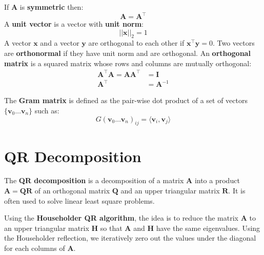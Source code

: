 \documentclass[12pt]{report}
\begin{document}
        If $\boldsymbol{A}$ is \textbf{symmetric} then:
        \begin{equation}
            \boldsymbol{A} = \boldsymbol{A}^\top
        \end{equation}
        A \textbf{unit vector} is a vector with \textbf{unit norm}:
        \begin{equation}
            ||\boldsymbol{x}||_2 = 1
        \end{equation}
        A vector $\boldsymbol{x}$ and a vector $\boldsymbol{y}$ are orthogonal to each other if $\boldsymbol{x}^\top \boldsymbol{y} = 0$.
        Two vectors are \textbf{orthonormal} if they have unit norm and are orthogonal.
        An \textbf{orthogonal matrix} is a squared matrix whose rows and columns are mutually orthogonal:
        \begin{align}
            \boldsymbol{A}^\top \boldsymbol{A} = \boldsymbol{A}\boldsymbol{A}^\top &= \boldsymbol{I} \\
            \boldsymbol{A}^\top &= \boldsymbol{A}^{-1}
        \end{align}
        
        The \textbf{Gram matrix} is defined as the pair-wise dot product of a set of vectors $\{\boldsymbol{v}_0 \dots \boldsymbol{v}_n\}$ such as:
        \begin{equation}
            G(\boldsymbol{v}_0 \dots \boldsymbol{v}_n)_{ij} =  \langle\boldsymbol{v}_i, \boldsymbol{v}_j\rangle
        \end{equation}
        \newpage

    \section{QR Decomposition}
        The \textbf{QR decomposition} is a decomposition of a matrix $\boldsymbol{A}$ into a product $\boldsymbol{A} = \boldsymbol{Q}\boldsymbol{R}$ of an orthogonal matrix $\boldsymbol{Q}$ and an upper triangular matrix $\boldsymbol{R}$. It is often used to solve linear least square problems.
    
        Using the \textbf{Householder QR algorithm}, the idea is to reduce the matrix   $\boldsymbol{A}$ to an upper triangular matrix $\boldsymbol{H}$ so that $\boldsymbol{A}$ and $\boldsymbol{H}$ have the same eigenvalues. Using the Householder reflection, we iteratively zero out the values under the diagonal for each columns of  $\boldsymbol{A}$.
        
\end{document}
